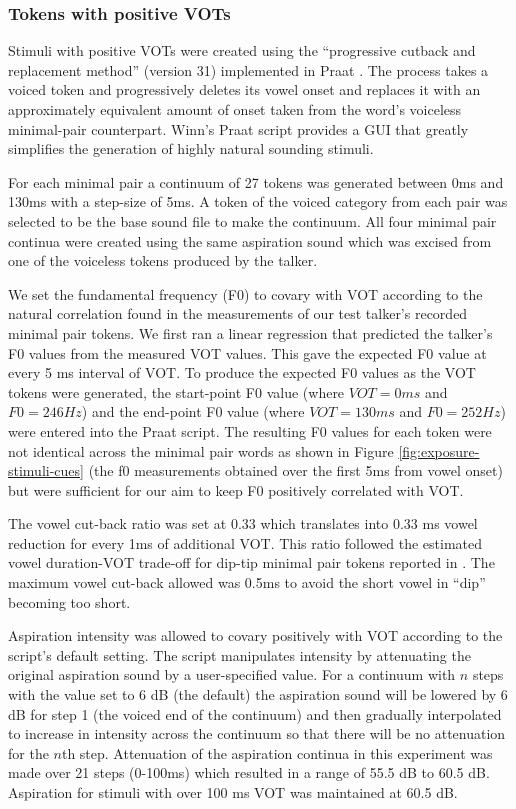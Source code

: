 \documentclass[
  11pt,
  man,mask,floatsintext]{apa6}
\begin{document}
\subsubsection{Tokens with positive VOTs}\label{tokens-with-positive-vots}

Stimuli with positive VOTs were created using the ``progressive cutback and replacement method'' (version 31) \autocite{winn2020} implemented in Praat \autocite{boersma2022}. The process takes a voiced token and progressively deletes its vowel onset and replaces it with an approximately equivalent amount of onset taken from the word's voiceless minimal-pair counterpart. Winn's Praat script provides a GUI that greatly simplifies the generation of highly natural sounding stimuli.

For each minimal pair a continuum of 27 tokens was generated between 0ms and 130ms with a step-size of 5ms. A token of the voiced category from each pair was selected to be the base sound file to make the continuum. All four minimal pair continua were created using the same aspiration sound which was excised from one of the voiceless tokens produced by the talker.

We set the fundamental frequency (F0) to covary with VOT according to the natural correlation found in the measurements of our test talker's recorded minimal pair tokens. We first ran a linear regression that predicted the talker's F0 values from the measured VOT values. This gave the expected F0 value at every 5 ms interval of VOT. To produce the expected F0 values as the VOT tokens were generated, the start-point F0 value (where \(VOT = 0ms\) and \(F0 = 246 Hz\)) and the end-point F0 value (where \(VOT = 130ms\) and \(F0 = 252 Hz\)) were entered into the Praat script. The resulting F0 values for each token were not identical across the minimal pair words as shown in Figure \ref{fig:exposure-stimuli-cues} (the f0 measurements obtained over the first 5ms from vowel onset) but were sufficient for our aim to keep F0 positively correlated with VOT.

The vowel cut-back ratio was set at 0.33 which translates into 0.33 ms vowel reduction for every 1ms of additional VOT. This ratio followed the estimated vowel duration-VOT trade-off for dip-tip minimal pair tokens reported in \textcite{allen-miller1999}. The maximum vowel cut-back allowed was 0.5ms to avoid the short vowel in ``dip'' becoming too short.

Aspiration intensity was allowed to covary positively with VOT according to the script's default setting. The script manipulates intensity by attenuating the original aspiration sound by a user-specified value. For a continuum with \(n\) steps with the value set to 6 dB (the default) the aspiration sound will be lowered by 6 dB for step 1 (the voiced end of the continuum) and then gradually interpolated to increase in intensity across the continuum so that there will be no attenuation for the \(n\)th step. Attenuation of the aspiration continua in this experiment was made over 21 steps (0-100ms) which resulted in a range of 55.5 dB to 60.5 dB. Aspiration for stimuli with over 100 ms VOT was maintained at 60.5 dB.
\end{document}
